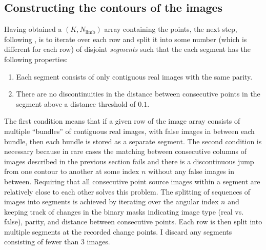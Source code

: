 \documentclass[12pt,dvipsnames]{report}
\begin{document}
\subsection{Constructing the contours of the images}
\label{ssec:constructing_contours}
Having obtained a $(K, N_\mathrm{limb})$ array containing the points, the next step, following 
\citet{2021MNRAS.503.6143K}, is to iterate over each row and split it into some number 
(which is different for each row) of disjoint \emph{segments} such that the each segment has 
the following properties:
\begin{enumerate}
    \item Each segment consists of only contiguous real images with the same parity. 
    \item There are no discontinuities in the distance between consecutive points in the 
    segment above a distance threshold of $0.1$.
\end{enumerate}
The first condition means that if a given row of the image array consists
of multiple ``bundles'' of contiguous real images, with false images in between each bundle, 
then each bundle is stored as a separate segment. The second condition is necessary because
in rare cases the matching between consecutive columns of images described in the previous 
section fails and there is a discontinuous jump from one contour to another at some 
index $n$ without any false images in between. Requiring that all consecutive point 
source images within a segment are relatively close to each other solves this problem.
The splitting of sequences of images into segments is achieved by iterating over the angular 
index $n$ and keeping track of changes in the binary masks indicating image type 
(real vs. false), parity, and distance between consecutive points. Each row is then split
into multiple segments at the recorded change points. I discard any segments  consisting  of 
fewer than 3 images.
\end{document}
